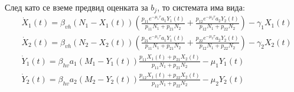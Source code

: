 След като се вземе предвид оценката за $b_j$, то системата има вида:
\begin{equation}
  \label{eq:MigrationProblem}
  \begin{split}
    &\dot{X}_1(t) = \beta_{vh} (N_1-X_1(t)) \left(\frac{p_{11} e^{-\mu_1 \tau} a_1  Y_1(t)}{p_{11} N_1 + p_{21} N_2} + \frac{p_{12} e^{-\mu_2 \tau} a_2  Y_2(t)}{p_{12} N_1 + p_{22} N_2}\right) - \gamma_1 X_1(t) \\
    &\dot{X}_2(t) = \beta_{vh} (N_2-X_2(t)) \left(\frac{p_{21} e^{-\mu_1 \tau} a_1  Y_1(t)}{p_{11} N_1 + p_{21} N_2} + \frac{p_{22} e^{-\mu_2 \tau} a_2  Y_2(t)}{p_{12} N_1 + p_{22} N_2}\right) - \gamma_2 X_2(t) \\
    &\dot{Y}_1(t) = \beta_{hv} a_1 (M_1-Y_1(t)) \frac{p_{11}  X_1(t) + p_{21}  X_2(t)}{p_{11} N_1 + p_{21} N_2} - \mu_1 Y_1(t) \\
    &\dot{Y}_2(t) = \beta_{hv} a_2 (M_2-Y_2(t)) \frac{p_{12}  X_1(t) + p_{22}  X_2(t)}{p_{12} N_1 + p_{22} N_2} - \mu_2 Y_2(t) \\
  \end{split}
\end{equation}

